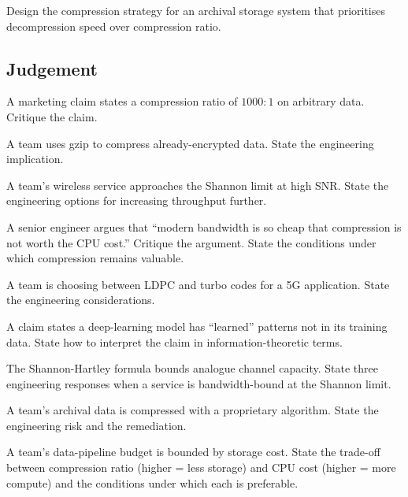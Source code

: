 \begin{exercise}
Design the compression strategy for an archival storage system that prioritises decompression speed over compression ratio.
\end{exercise}

\subsection*{Judgement}

\begin{exercise}
A marketing claim states a compression ratio of $1000:1$ on arbitrary data. Critique the claim.
\end{exercise}

\begin{exercise}
A team uses gzip to compress already-encrypted data. State the engineering implication.
\end{exercise}

\begin{exercise}
A team's wireless service approaches the Shannon limit at high SNR. State the engineering options for increasing throughput further.
\end{exercise}

\begin{exercise}
A senior engineer argues that ``modern bandwidth is so cheap that compression is not worth the CPU cost.'' Critique the argument. State the conditions under which compression remains valuable.
\end{exercise}

\begin{exercise}
A team is choosing between LDPC and turbo codes for a 5G application. State the engineering considerations.
\end{exercise}

\begin{exercise}
A claim states a deep-learning model has ``learned'' patterns not in its training data. State how to interpret the claim in information-theoretic terms.
\end{exercise}

\begin{exercise}
The Shannon-Hartley formula bounds analogue channel capacity. State three engineering responses when a service is bandwidth-bound at the Shannon limit.
\end{exercise}

\begin{exercise}
A team's archival data is compressed with a proprietary algorithm. State the engineering risk and the remediation.
\end{exercise}

\begin{exercise}
A team's data-pipeline budget is bounded by storage cost. State the trade-off between compression ratio (higher = less storage) and CPU cost (higher = more compute) and the conditions under which each is preferable.
\end{exercise}
